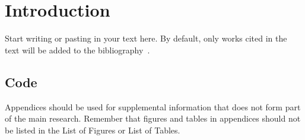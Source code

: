 \documentclass{sfuthesis}
\begin{document}
%
%

\mainmatter

\chapter{Introduction}

Start writing or pasting in your text here. By default, only works cited in the text will be added to the bibliography~\cite{latexcompanion}. 


%
%
%
%
%

\backmatter%
    
    

\begin{appendices} %
\chapter{Code}

Appendices should be used for supplemental information that does not form part of the main research. Remember that figures and tables in appendices should not be listed in the List of Figures or List of Tables.

\end{appendices}
\end{document}
